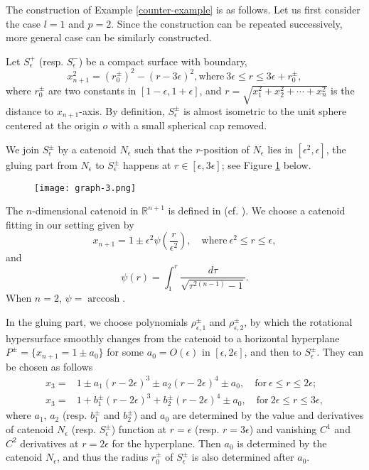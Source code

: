 \documentclass{amsart}
\numberwithin{equation}{section}
\theoremstyle{remark}
\renewcommand{\(}{\left(}
\renewcommand{\)}{\right)}
\renewcommand{\~}{\tilde}
\renewcommand{\-}{\overline}
\newcommand{\e}{\epsilon}
\begin{document}
The construction of Example \ref{counter-example} is as follows. Let us first consider the case $l=1$ and $p=2$. Since the construction can be repeated successively, more general case can be similarly constructed.

Let $S_\e^{+}$ (resp. $S_\e^{-}$) be a compact surface with boundary,
$$x_{n+1}^2=(r_0^{\pm})^2-(r-3\e)^2, \text{where}~ 3\e  \leq r \leq 3\e+r_0^{\pm},$$
where $r_0^{\pm}$ are two constants in $[1-\e,1+\e]$, and $r=\sqrt{x_1^2+x_2^2+\cdots+x_{n}^2}$ is the distance to $x_{n+1}$-axis.
By definition, $S_\e^{\pm}$ is almost isometric to the unit sphere centered at the origin $o$ with a small spherical cap removed.

We join $S_\e^{\pm}$ by a catenoid $N_\e$ such that the $r$-position of $N_\e$ lies in $[\e^2,\e]$, the gluing part from $N_\e$ to $S_\e^{\pm}$ happens at $r\in [\e,3\e]$; see Figure \ref{fig:2} below.
\begin{figure}[htbp]
	\centering
	\texttt{[image: graph-3.png]}
	\caption{}
	\label{fig:2}
\end{figure}

The $n$-dimensional catenoid in $\mathbb R^{n+1}$ is defined in \cite{doCarmo-Dajczer1983} (cf. \cite{Tam-Zhou2009}). We choose a catenoid fitting in our setting given by
$$x_{n+1}=1\pm\e^2 \psi\(\frac{r}{\e^2}\), \quad \text{where}~\e^2 \leq r \leq \e,$$
and $$\psi(r)=\int_1^{r} \frac{d \tau}{\sqrt{\tau^{2(n-1)}-1}}.$$
When $n=2$, $\psi=\operatorname{arccosh}$.

In the gluing part, we choose polynomials $\rho_{\e,1}^{\pm}$ and $\rho_{\e,2}^{\pm}$, by which the rotational hypersurface smoothly changes from the catenoid to a horizontal hyperplane $P^\pm=\{x_{n+1}=1\pm a_0\}$ for some $a_0=O(\e)$ in $[\e,2\e]$, and then to $S_\e^{\pm}$. They can be chosen as follows
\begin{align*}
x_{3}=&1 \pm a_1 (r-2\e)^3 \pm a_2 (r-2\e)^4 \pm a_0,   \quad \text{for}~\e   \leq r \leq 2\e;\\
x_{3}=&1+b_1^{\pm} (r-2\e)^3+b_2^{\pm} (r-2\e)^4 \pm a_0,   \quad \text{for}~2\e  \leq r \leq 3\e,
\end{align*}
where $a_1$, $a_2$ (resp. $b_1^{\pm}$ and $b_2^{\pm}$) and $a_0$ are determined by the value and derivatives of catenoid $N_\e$ (resp. $S_\e^\pm$) function at $r=\e$ (resp. $r=3\e$) and vanishing $C^1$ and $C^2$ derivatives at $r=2\e$ for the hyperplane. Then $a_0$ is determined by the catenoid $N_\e$, and thus the radius $r_0^\pm$ of $S_\e^{\pm}$ is also determined after $a_0$.
\end{document}
